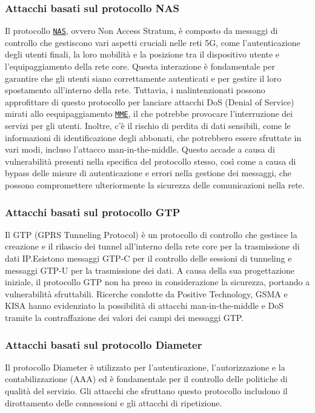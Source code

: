 \documentclass[english]{article}
\begin{document}
\subsubsection{Attacchi basati sul protocollo NAS}
Il protocollo \texttt{\hyperlink{NAS}{NAS}}, ovvero Non Access Stratum, è
composto da messaggi di controllo che gestiscono vari aspetti cruciali nelle
reti 5G, come l'autenticazione degli utenti finali, la loro mobilità e la
posizione tra il dispositivo utente e l'equipaggiamento della rete core.\@
Questa interazione è fondamentale per garantire che gli utenti siano
correttamente autenticati e per gestire il loro spostamento all'interno della
rete. Tuttavia, i malintenzionati possono approfittare di questo protocollo per
lanciare attacchi DoS (Denial of Service) mirati allo eequipaggiamento
\texttt{\hyperlink{MME}{MME}}, il che potrebbe provocare l'interruzione dei
servizi per gli utenti. Inoltre, c'è il rischio di perdita di dati sensibili,
come le informazioni di identificazione degli abbonati, che potrebbero essere
sfruttate in vari modi, incluso l'attacco man-in-the-middle. Questo accade a
causa di vulnerabilità presenti nella specifica del protocollo stesso, così
come a causa di bypass delle misure di autenticazione e errori nella gestione
dei messaggi, che possono compromettere ulteriormente la sicurezza delle
comunicazioni nella rete.

\subsubsection{Attacchi basati sul protocollo GTP}
Il GTP (GPRS Tunneling Protocol) è un protocollo di controllo che gestisce la
creazione e il rilascio dei tunnel all'interno della rete core per la
trasmissione di dati IP.\@ Esistono messaggi GTP-C per il controllo delle
sessioni di tunneling e messaggi GTP-U per la trasmissione dei dati. A causa
della sua progettazione iniziale, il protocollo GTP non ha preso in
considerazione la sicurezza, portando a vulnerabilità sfruttabili. Ricerche
condotte da Positive Technology, GSMA e KISA hanno evidenziato la possibilità
di attacchi man-in-the-middle e DoS tramite la contraffazione dei valori dei
campi dei messaggi GTP.\@

\subsubsection{Attacchi basati sul protocollo Diameter}
Il protocollo Diameter è utilizzato per l'autenticazione, l'autorizzazione e la
contabilizzazione (AAA) ed è fondamentale per il controllo delle politiche di
qualità del servizio. Gli attacchi che sfruttano questo protocollo includono il
dirottamento delle connessioni e gli attacchi di ripetizione.
\end{document}
